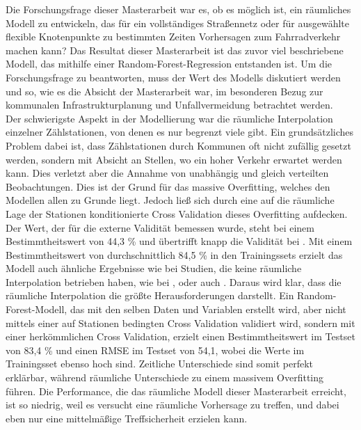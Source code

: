 \documentclass[a4paper,12pt]{thesis}
\begin{document}
Die Forschungsfrage dieser Masterarbeit war es, ob es möglich ist, ein räumliches Modell zu entwickeln, das für ein vollständiges Straßennetz oder für ausgewählte flexible Knotenpunkte zu bestimmten Zeiten Vorhersagen zum Fahrradverkehr machen kann? Das Resultat dieser Masterarbeit ist das zuvor viel beschriebene Modell, das mithilfe einer Random-Forest-Regression entstanden ist. Um die Forschungsfrage zu beantworten, muss der Wert des Modells diskutiert werden und so, wie es die Absicht der Masterarbeit war, im besonderen Bezug zur kommunalen Infrastrukturplanung und Unfallvermeidung betrachtet werden.\\
Der schwierigste Aspekt in der Modellierung war die räumliche Interpolation einzelner Zählstationen, von denen es nur begrenzt viele gibt. Ein grundsätzliches Problem dabei ist, dass Zählstationen durch Kommunen oft nicht zufällig gesetzt werden, sondern mit Absicht an Stellen, wo ein hoher Verkehr erwartet werden kann. Dies verletzt aber die Annahme von unabhängig und gleich verteilten Beobachtungen. Dies ist der Grund für das massive Overfitting, welches den Modellen allen zu Grunde liegt. Jedoch ließ sich durch eine auf die räumliche Lage der Stationen konditionierte Cross Validation dieses Overfitting aufdecken. Der Wert, der für die externe Validität bemessen wurde, steht bei einem Bestimmtheitswert von 44,3 \% und übertrifft knapp die Validität bei \cite{Alattar2021}. Mit einem Bestimmtheitswert von durchschnittlich 84,5 \% in den Trainingssets erzielt das Modell auch ähnliche Ergebnisse wie bei Studien, die keine räumliche Interpolation betrieben haben, wie bei \cite{Holmgren2017}, \cite{Broucke2019} oder auch \cite{Wessel2020}. Daraus wird klar, dass die räumliche Interpolation die größte Herausforderungen darstellt. Ein Random-Forest-Modell, das mit den selben Daten und Variablen erstellt wird, aber nicht mittels einer auf Stationen bedingten Cross Validation validiert wird, sondern mit einer herkömmlichen Cross Validation, erzielt einen Bestimmtheitswert im Testset von 83,4 \% und einen RMSE im Testset von 54,1, wobei die Werte im Trainingsset ebenso hoch sind. Zeitliche Unterschiede sind somit perfekt erklärbar, während räumliche Unterschiede zu einem massivem Overfitting führen. Die Performance, die das räumliche Modell dieser Masterarbeit erreicht, ist so niedrig, weil es versucht eine räumliche Vorhersage zu treffen, und dabei eben nur eine mittelmäßige Treffsicherheit erzielen kann.\\
\end{document}
